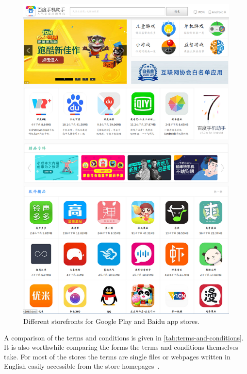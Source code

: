 \documentclass[thesis.tex]{subfiles}
\begin{document}
\begin{figure}
\begin{minipage}{\linewidth}
\begin{minipage}{0.48\linewidth}
      \includegraphics[width=\linewidth]{figures/baidu-storefront.png}
    \end{minipage}
  \end{minipage}
  \caption{Different storefronts for Google Play and Baidu app stores.}
  \label{fig:storefronts}
\end{figure}

A comparison of the terms and conditions is given in \autoref{tab:terms-and-conditions}.
It is also worthwhile comparing the forms the terms and conditions themselves take.
For most of the stores the terms are single files or webpages written in English easily accessible from the store homepages~\cite{yandex_yandex.store_nodate,aptoide_aptoide_nodate,google_google_nodate,amazon_amazon.co.uk_nodate}.  
\end{document}
